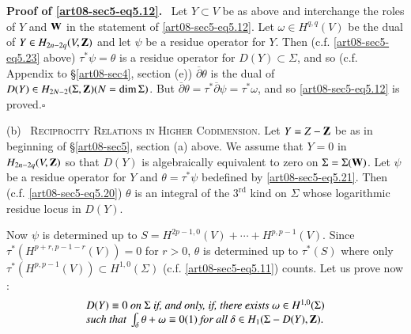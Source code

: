 \noindent
{\bf Proof of \eqref{art08-sec5-eq5.12}.}~ Let $Y\subset V$ be as above and interchange the roles of $Y$ and $\mathbf{W}$ in the statement of \eqref{art08-sec5-eq5.12}. Let $\omega\in H^{q,q}(V)$ be the dual of $Y\in H_{2n-2q}(V,\mathbf{Z})$ and let $\psi$ be a residue operator for $Y$. Then (c.f. \eqref{art08-sec5-eq5.23} above) $\tau^{*}\psi=\theta$ is a residue operator for $D(Y)\subset \Sigma$, and so (c.f. Appendix to \S\ref{art08-sec4}, section (e)) $\overline{\partial}\theta$ is the dual of $D(Y)\in H_{2N-2}(\Sigma,\mathbf{Z})(N=\dim \Sigma)$. But $\overline{\partial}\theta=\tau^{*}\overline{\partial}\psi=\tau^{*}\omega$, and so \eqref{art08-sec5-eq5.12} is proved.\hfill$\square$

\medskip
(b)~ \textsc{Reciprocity Relations in Higher Codimension.} Let $Y=Z-\mathbf{Z}$ be as in beginning of \S\ref{art08-sec5}, section (a) above. We assume that $Y=0$ in $H_{2n-2q}(V,\mathbf{Z})$ so that $D(Y)$ is algebraically equivalent to zero on $\Sigma=\Sigma(\mathbf{W})$. Let $\psi$ be a residue operator for $Y$ and $\theta=\tau^{*}\psi$ be\pageoriginale defined by \eqref{art08-sec5-eq5.21}. Then (c.f. \eqref{art08-sec5-eq5.20}) $\theta$ is an integral of the $3^{\text{rd}}$ kind on $\Sigma$ whose logarithmic residue locus in $D(Y)$.

Now $\psi$ is determined up to $S=H^{2p-1,0}(V)+\cdots+H^{p,p-1}(V)$. Since $\tau^{*}(H^{p+r,p-1-r}(V))=0$ for $r>0$, $\theta$ is determined up to $\tau^{*}(S)$ where only $\tau^{*}(H^{p,p-1}(V))\subset H^{1,0}(\Sigma)$ (c.f. \eqref{art08-sec5-eq5.11}) counts. Let us prove now :
\begin{equation}
\begin{array}{l}
D(Y)\equiv 0\text{~\em on~} \Sigma \text{~\em if, and only, if, there exists~}\omega\in H^{1,0}(\Sigma)\\
\text{\em such that~}\int_{\delta}\theta+\omega\equiv 0(1)\text{~\em for all~}\delta\in H_{1}(\Sigma-D(Y),\mathbf{Z}).
\end{array}\label{art08-sec5-eq5.24}
\end{equation}


